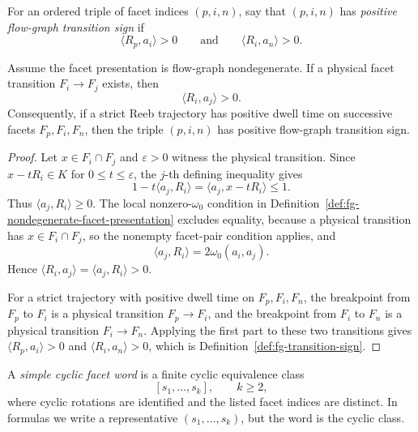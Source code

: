 \begin{unverified}
\begin{definition}%
\label{def:fg-transition-sign}
For an ordered triple of facet indices \((p,i,n)\), say that
\((p,i,n)\) has \emph{positive flow-graph transition sign} if
\[
  \langle R_p,a_i\rangle>0
  \qquad\text{and}\qquad
  \langle R_i,a_n\rangle>0.
\]
\end{definition}
\end{unverified}

\begin{unverified}
\begin{lemma}%
\label{lem:fg-local-transition-regularity-positive-sign}
Assume the facet presentation is flow-graph nondegenerate.  If a physical
facet transition \(F_i\to F_j\) exists, then
\[
  \langle R_i,a_j\rangle>0 .
\]
Consequently, if a strict Reeb trajectory has positive dwell time on
successive facets \(F_p,F_i,F_n\), then the triple \((p,i,n)\) has positive
flow-graph transition sign.
\end{lemma}

\begin{proof}
Let \(x\in F_i\cap F_j\) and \(\varepsilon>0\) witness the physical
transition.  Since \(x-tR_i\in K\) for \(0\le t\le\varepsilon\), the
\(j\)-th defining inequality gives
\[
  1-t\langle a_j,R_i\rangle
  =
  \langle a_j,x-tR_i\rangle
  \le 1 .
\]
Thus \(\langle a_j,R_i\rangle\ge0\).  The local nonzero-\(\omega_0\)
condition in Definition~\ref{def:fg-nondegenerate-facet-presentation} excludes
equality, because a physical transition has \(x\in F_i\cap F_j\), so the
nonempty facet-pair condition applies, and
\[
  \langle a_j,R_i\rangle=2\omega_0(a_i,a_j).
\]
Hence \(\langle R_i,a_j\rangle=\langle a_j,R_i\rangle>0\).

For a strict trajectory with positive dwell time on
\(F_p,F_i,F_n\), the breakpoint from \(F_p\) to \(F_i\) is a physical
transition \(F_p\to F_i\), and the breakpoint from \(F_i\) to \(F_n\) is a
physical transition \(F_i\to F_n\).  Applying the first part to these two
transitions gives
\(\langle R_p,a_i\rangle>0\) and \(\langle R_i,a_n\rangle>0\), which is
Definition~\ref{def:fg-transition-sign}.
\end{proof}
\end{unverified}

\begin{unverified}
\begin{definition}\label{def:fg-simple-cyclic-word}
A \emph{simple cyclic facet word} is a finite cyclic equivalence class
\[
  [s_1,\ldots,s_k],
  \qquad k\ge2,
\]
where cyclic rotations are identified and the listed facet indices are
distinct.  In formulas we write a representative \((s_1,\ldots,s_k)\), but
the word is the cyclic class.
\end{definition}
\end{unverified}

